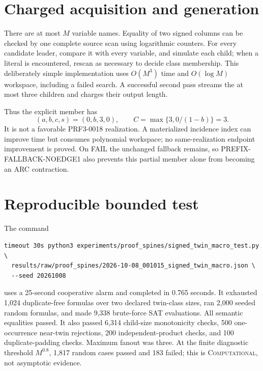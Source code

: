 \documentclass[11pt]{article}
\begin{document}
\section{Charged acquisition and generation}
There are at most $M$ variable names.  Equality of two signed columns can be
checked by one complete source scan using logarithmic counters.  For every
candidate leader, compare it with every variable, and simulate each child;
when a literal is encountered, rescan as necessary to decide class membership.
This deliberately simple implementation uses $O(M^3)$ time and
$O(\log M)$ workspace, including a failed search.  A successful second pass
streams the at most three children and charges their output length.

Thus the explicit member has
\[
 (a,b,c,s)=(0,b,3,0),\qquad
 C=\max\{3,0/(1-b)\}=3.
\]
It is not a favorable PRF3-0018 realization.  A materialized incidence index
can improve time but consumes polynomial workspace; no same-realization
endpoint improvement is proved.  On FAIL the unchanged fallback remains, so
PREFIX-FALLBACK-NOEDGE1 also prevents this partial member alone from becoming
an ARC contraction.

\section{Reproducible bounded test}
The command
\begin{verbatim}
timeout 30s python3 experiments/proof_spines/signed_twin_macro_test.py \
  results/raw/proof_spines/2026-10-08_001015_signed_twin_macro.json \
  --seed 20261008
\end{verbatim}
uses a 25-second cooperative alarm and completed in 0.765 seconds.  It
exhausted 1,024 duplicate-free formulas over two declared twin-class sizes,
ran 2,000 seeded random formulas, and made 9,338 brute-force SAT evaluations.
All semantic equalities passed.  It also passed 6,314 child-size monotonicity
checks, 500 one-occurrence near-twin rejections, 200 independent-product
checks, and 100 duplicate-padding checks.  Maximum fanout was three.  At the
finite diagnostic threshold $M^{0.8}$, 1,817 random cases passed and 183
failed; this is \textsc{Computational}, not asymptotic evidence.
\end{document}
